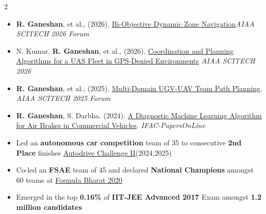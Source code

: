 \documentclass[10pt,a4paper,ragged2e,withhyper]{altacv}
\begin{document}
\begin{paracol}{2}
\vspace{-0.25em}

\begin{itemize}
    \item \textbf{R. Ganeshan}, et al., (2026). {\color{OxfordBlue}\href{https://arc.aiaa.org/doi/10.2514/6.2026-1201}{Bi-Objective Dynamic Zone Navigation}}\emph{AIAA SCITECH 2026 Forum}
    \vspace{-0.3em}
    \item N. Kumar, \textbf{R. Ganeshan}, et al., (2026). {\color{OxfordBlue}\href{https://arc.aiaa.org/doi/10.2514/6.2026-1091}{Coordination and Planning Algorithms for a UAS Fleet in GPS-Denied Environments}} \emph{AIAA SCITECH 2026} 
    \vspace{-0.3em}
    \item \textbf{R. Ganeshan}, et al., (2025). {\color{OxfordBlue}\href{https://arc.aiaa.org/doi/10.2514/6.2025-2161}{Multi-Domain UGV-UAV Team Path Planning}}. \emph{AIAA SCITECH 2025 Forum}
    \vspace{-0.3em}
    \item \textbf{R. Ganeshan}, S. Darbha. (2024). {\color{OxfordBlue}\href{https://doi.org/10.1016/j.ifacol.2024.07.321}{A Diagnostic Machine Learning Algorithm for Air Brakes in Commercial Vehicles}}. \emph{IFAC-PapersOnLine}
\end{itemize}

\vspace{-0.25em}
\divider
\vspace{-0.5em}

\vspace{-0.25em}
\begin{itemize}
\item \small Led an \textbf{autonomous car competition} team of 35 to consecutive \textbf{2nd Place} finishes {\color{OxfordBlue}\href{https://www.youtube.com/watch?v=yfAE5uTY3LE}{Autodrive Challenge II}}(2024,2025)
\item \small Co-led an \textbf{FSAE} team of 45 and declared \textbf{National Champions} amongst 60 teams at \href{https://www.formulabharat.com/}{Formula Bharat 2020}
\vspace{-0.3em}
\item \small Emerged in the top \textbf{0.16\%} of \textbf{IIT-JEE Advanced 2017} Exam amongst \textbf{1.2 million candidates}
\vspace{-0.3em}
\end{itemize}






\end{paracol}
\end{document}
